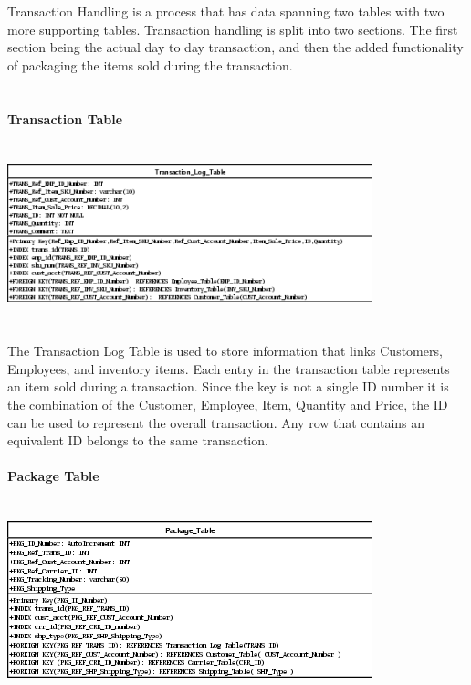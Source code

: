 \documentclass{report}
\begin{document}
\begin{itemize}
        Transaction Handling is a process that has data spanning two tables with two more supporting
        tables. Transaction handling is split into two sections. The first section being the actual
        day to day transaction, and then the added functionality of packaging the items sold during
        the transaction.\\
        \\
        \\
        {\bf Transaction Table}\\
        \\
        \\
        \includegraphics{Tables/TransactionLogTable.png}\\
        \\
        \\
        The Transaction Log Table is used to store information that links Customers, Employees, and
        inventory items. Each entry in the transaction table represents an item sold during a transaction.
        Since the key is not a single ID number it is the combination of the Customer, Employee, Item,
        Quantity and Price, the ID can be used to represent the overall transaction. Any row that contains
        an equivalent ID belongs to the same transaction.
        \\
        \\
        {\bf Package Table}\\
        \\
        \\
        \includegraphics{Tables/PackageTable.png}\\
        \\

\end{itemize}
\end{document}
